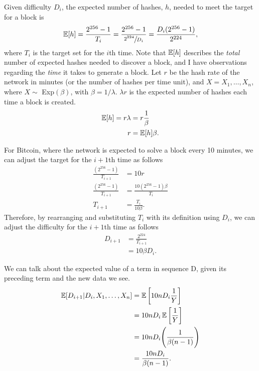 Given difficulty $D_i$, the expected number of hashes, $h$, needed to meet the target for a block is
\begin{align}
\operatorname{\mathbb{E}}[h] =  \frac{2^{256}-1}{T_i} = \frac{2^{256}-1}{\sfrac{2^{224}}{D_i}} = \frac{D_i(2^{256}-1)}{2^{224}}, 
\end{align}
where $T_i$ is the target set for the $i$th time. Note that $\operatorname{\mathbb{E}}[h]$ describes the \textit{total} number of expected hashes needed to discover a block, and I have observations regarding the \textit{time} it takes to generate a block. Let $r$ be the hash rate of the network in minutes (or the number of hashes per time unit), and $X = X_1, \dots, X_{n}$, where $X \sim$ Exp$(\beta)$, with $\beta = 1/\lambda$. $\lambda r$ is the expected number of hashes each time a block is created.  %
\begin{align}
\operatorname{\mathbb{E}}[h] = r \lambda &= r \frac{1}{\beta}  \\
r &= \operatorname{\mathbb{E}}[h] \beta.
\end{align}

For Bitcoin, where the network is expected to solve a block every 10 minutes, we can adjust the target for the $i+1$th time as follows 
\begin{align}
\frac{(2^{256}-1)}{T_{i+1}} &= 10r \\
\frac{(2^{256}-1)}{T_{i+1}} &= \frac{10(2^{256}-1)\beta}{T_i} \\
T_{i+1} &= \frac{T_i}{10\beta}.
\end{align}
Therefore, by rearranging and substituting $T_i$ with its definition using $D_i$, we can adjust the difficulty for the $i+1$th time as follows 
\begin{align}
D_{i+1} &= \frac{2^{224}}{T_{i+1}} \\
&= 10\beta D_i.
\end{align}

We can talk about the expected value of a term in sequence D, given its preceding term and the new data we see. 
\begin{align}
\operatorname{\mathbb{E}}[D_{i+1} | D_{i}, X_1, \dots, X_{n}] &= \operatorname{\mathbb{E}}\bigg[10n D_i \frac{1}{Y}\bigg] \\
&= 10n D_i \operatorname{\mathbb{E}}\bigg[\frac{1}{Y}\bigg] \\
&= 10n D_i \Bigg(\frac{1}{\beta(n-1)}\Bigg) \\
&= \frac{10n D_i}{\beta(n-1)}.
\end{align}

